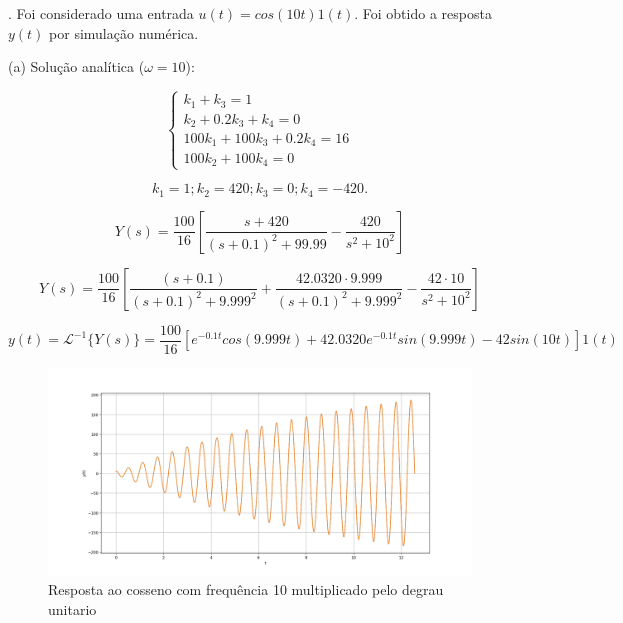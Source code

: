 \documentclass[10pt]{article}
\begin{document}
. Foi considerado uma entrada $u(t) = cos(10 t) 1(t)$. Foi obtido a resposta $y(t)$ por simulação numérica.

\quad (a) Solução analítica ($\omega = 10$):

\begin{equation}
    \left\{
    \begin{array}{l}
        k_1 + k_3 = 1 \\
        k_2 + 0.2k_3 +k_4 = 0 \\
        100k_1 + 100k_3 + 0.2k_4 = 16 \\
        100k_2 + 100k_4 = 0
    \end{array}
    \right. 
\end{equation}

\begin{equation}
    k_1 = 1; k_2 = 420; k_3 = 0; k_4 = -420.
\end{equation}

\begin{equation}
    Y(s) = \frac{100}{16} \left[ \frac{s+420}{(s + 0.1)^2 + 99.99} - \frac{420}{s^2 + 10^2} \right]
\end{equation}

\begin{equation}
    Y(s) = \frac{100}{16} \left[ \frac{(s + 0.1)}{(s + 0.1)^2 + 9.999^2} + \frac{42.0320 \cdot 9.999}{(s + 0.1)^2 + 9.999^2} - \frac{42 \cdot 10}{s^2 + 10^2} \right]
\end{equation}

\begin{equation}
    y(t) = \mathcal{L}^{-1} \{Y(s) \} = \frac{100}{16} \left[ e^{-0.1t}cos(9.999t) + 42.0320e^{-0.1t}sin(9.999t) - 42sin(10t) \right] 1(t)
\end{equation}

\begin{figure}[h]
    \centering
    \includegraphics[scale=0.45]{questao3.png}
    \caption{Resposta ao cosseno com frequência 10 multiplicado pelo degrau unitario}
\end{figure}
\end{document}
